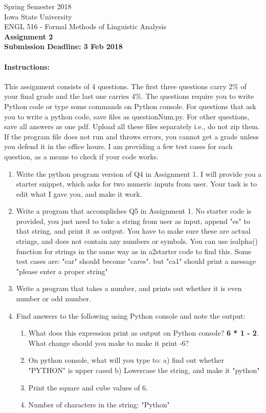 \documentclass[11pt,a4paper]{article}
\begin{document}
\begin{center}
  Spring Semester 2018 \\ Iowa State University\\[3ex]
  {\large ENGL 516 - Formal Methods of Linguistic Analysis}\\[3ex]
  \textbf{Assignment 2} \\ \textbf{Submission Deadline: 3 Feb 2018}
\end{center}


\paragraph{Instructions:} This assignment consists of 4 questions. The first three questions carry 2\% of your final grade and the last one carries 4\%. The questions require you to write Python code or type some commands on Python console. For questions that ask you to write a python code, save files as questionNum.py. For other questions, save all answers as one pdf. Upload all these files separately i.e., do not zip them. If the program file does not run and throws errors, you cannot get a grade unless you defend it in the office hours. I am providing a few test cases for each question, as a means to check if your code works.

\begin{enumerate}
\item Write the python program version of Q4 in Assignment 1. I will provide you a starter snippet, which asks for two numeric inputs from user. Your task is to edit what I gave you, and make it work.

\item Write a program that accomplishes Q5 in Assignment 1. No starter code is provided, you just need to take a string from user as input, append "es" to that string, and print it as output. You have to make sure these are actual strings, and does not contain any numbers or symbols. You can use isalpha() function for strings in the same way as in a2starter code to find this. 
Some test cases are: "car" should become "cares". but "ca1" should print a message "please enter a proper string"

\item Write a program that takes a number, and prints out whether it is even number or odd number. 

\item Find answers to the following using Python console and note the output:
\begin{enumerate}
\item What does this expression print as output on Python console? \textbf{6 * 1 - 2}. What change should you make to make it print -6?

\item On python console, what will you type to: a) find out whether "PYTHON" is upper cased   b) Lowercase the string, and make it "python"  

\item Print the square and cube values of 6.

\item Number of characters in the string: "Python"
\end{enumerate}
\end{enumerate}
\end{document}
